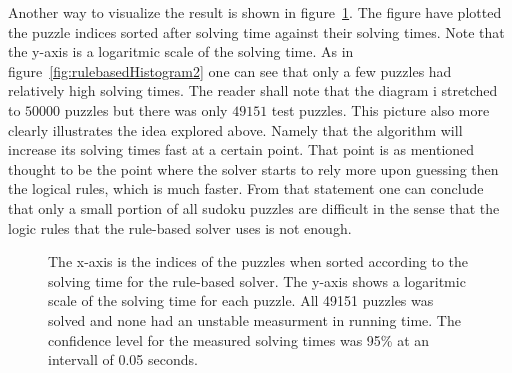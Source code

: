 \documentclass[a4paper,11pt]{kth-mag}
\begin{document}
\FloatBarrier
Another way to visualize the result is shown in figure~\ref{fig:rulebasedIndices}.
The figure have plotted the puzzle indices sorted after solving time against their solving times.
Note that the y-axis is a logaritmic scale of the solving time.
As in figure~\ref{fig:rulebasedHistogram2} one can see that only a few puzzles had relatively high solving times.
The reader shall note that the diagram i stretched to $50000$ puzzles but there was only $49151$ test puzzles.   
This picture also more clearly illustrates the idea explored above.
Namely that the algorithm will increase its solving times fast at a certain point.
That point is as mentioned thought to be the point where the solver starts to rely more upon guessing then the logical rules, which is much faster.
From that statement one can conclude that only a small portion of all sudoku puzzles are difficult in the sense that the logic rules that the rule-based solver uses is not enough.
\\
\begin{figure}[here] 
\noindent{}
\vspace{-25pt}
\caption{The x-axis is the indices of the puzzles when sorted according to the solving time for the rule-based solver. The y-axis shows a logaritmic scale of the solving time for each puzzle. All 49151 puzzles was solved and none had an unstable measurment in running time. The confidence level for the measured solving times was 95\% at an intervall of 0.05 seconds.}
\label{fig:rulebasedIndices}
\end{figure}

\FloatBarrier
\end{document}
